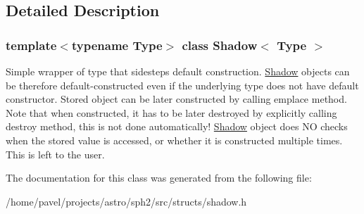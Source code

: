 \subsection{Detailed Description}
\subsubsection*{template$<$typename Type$>$\newline
class Shadow$<$ Type $>$}

Simple wrapper of type that sidesteps default construction. \hyperlink{classShadow}{Shadow} objects can be therefore default-\/constructed even if the underlying type does not have default constructor. Stored object can be later constructed by calling {\ttfamily emplace} method. Note that when constructed, it has to be later destroyed by explicitly calling {\ttfamily destroy} method, this is not done automatically! \hyperlink{classShadow}{Shadow} object does NO checks when the stored value is accessed, or whether it is constructed multiple times. This is left to the user. 

The documentation for this class was generated from the following file\+:\begin{DoxyCompactItemize}
\item 
/home/pavel/projects/astro/sph2/src/structs/shadow.\+h\end{DoxyCompactItemize}

